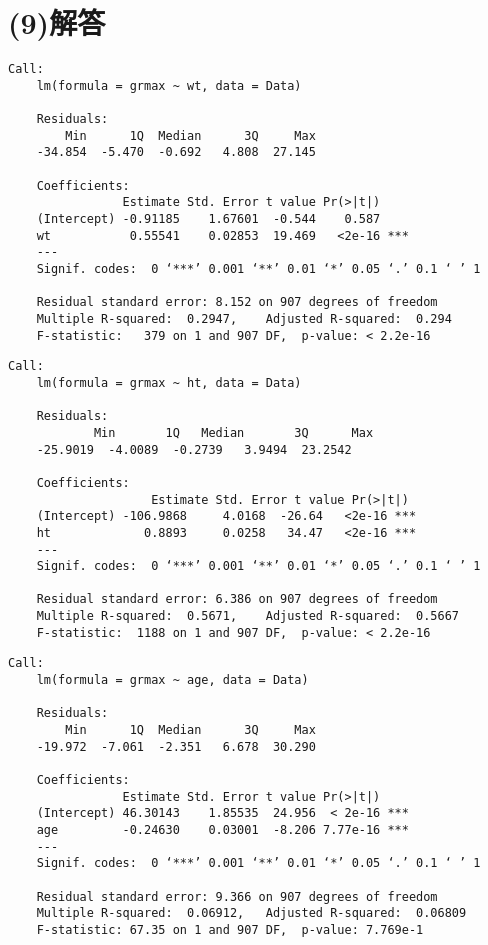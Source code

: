 \documentclass[fontsize = 8pt, paper= a4]{jlreq}
\begin{document}
\section{(9)解答}
\begin{lstlisting}[basicstyle=\ttfamily\footnotesize, frame=single]
    Call:
    lm(formula = grmax ~ wt, data = Data)
    
    Residuals:
        Min      1Q  Median      3Q     Max 
    -34.854  -5.470  -0.692   4.808  27.145 
    
    Coefficients:
                Estimate Std. Error t value Pr(>|t|)    
    (Intercept) -0.91185    1.67601  -0.544    0.587    
    wt           0.55541    0.02853  19.469   <2e-16 ***
    ---
    Signif. codes:  0 ‘***’ 0.001 ‘**’ 0.01 ‘*’ 0.05 ‘.’ 0.1 ‘ ’ 1
    
    Residual standard error: 8.152 on 907 degrees of freedom
    Multiple R-squared:  0.2947,    Adjusted R-squared:  0.294 
    F-statistic:   379 on 1 and 907 DF,  p-value: < 2.2e-16
    \end{lstlisting}
\begin{lstlisting}[basicstyle=\ttfamily\footnotesize, frame=single]
    Call:
    lm(formula = grmax ~ ht, data = Data)
    
    Residuals:
            Min       1Q   Median       3Q      Max 
    -25.9019  -4.0089  -0.2739   3.9494  23.2542 
    
    Coefficients:
                    Estimate Std. Error t value Pr(>|t|)    
    (Intercept) -106.9868     4.0168  -26.64   <2e-16 ***
    ht             0.8893     0.0258   34.47   <2e-16 ***
    ---
    Signif. codes:  0 ‘***’ 0.001 ‘**’ 0.01 ‘*’ 0.05 ‘.’ 0.1 ‘ ’ 1
    
    Residual standard error: 6.386 on 907 degrees of freedom
    Multiple R-squared:  0.5671,    Adjusted R-squared:  0.5667 
    F-statistic:  1188 on 1 and 907 DF,  p-value: < 2.2e-16
    \end{lstlisting}
\begin{lstlisting}[basicstyle=\ttfamily\footnotesize, frame=single]   
    Call:
    lm(formula = grmax ~ age, data = Data)

    Residuals:
        Min      1Q  Median      3Q     Max 
    -19.972  -7.061  -2.351   6.678  30.290 

    Coefficients:
                Estimate Std. Error t value Pr(>|t|)    
    (Intercept) 46.30143    1.85535  24.956  < 2e-16 ***
    age         -0.24630    0.03001  -8.206 7.77e-16 ***
    ---
    Signif. codes:  0 ‘***’ 0.001 ‘**’ 0.01 ‘*’ 0.05 ‘.’ 0.1 ‘ ’ 1

    Residual standard error: 9.366 on 907 degrees of freedom
    Multiple R-squared:  0.06912,   Adjusted R-squared:  0.06809 
    F-statistic: 67.35 on 1 and 907 DF,  p-value: 7.769e-1
    \end{lstlisting}
\end{document}
